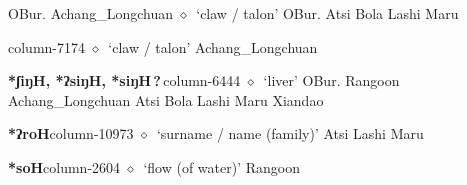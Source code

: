 \hspace{1ex}
         OBur. 
\hspace{1ex}
         Achang\_Longchuan 
\hspace{1ex}
         $\diamond$~`claw / talon'
         OBur. 
\hspace{1ex}
         Atsi 
\hspace{1ex}
         Bola 
\hspace{1ex}
         Lashi 
\hspace{1ex}
         Maru 
  \item {\footnotesize \textbf{}}{\tiny column-7174}
         $\diamond$~`claw / talon'
         Achang\_Longchuan 
  \item {\footnotesize \textbf{*ʃiŋH, *ʔsiŋH, *siŋH\,?\,}}{\tiny column-6444}
         $\diamond$~`liver'
         OBur. 
\hspace{1ex}
         Rangoon 
\hspace{1ex}
         Achang\_Longchuan 
\hspace{1ex}
         Atsi 
\hspace{1ex}
         Bola 
\hspace{1ex}
         Lashi 
\hspace{1ex}
         Maru 
\hspace{1ex}
         Xiandao 
  \item {\footnotesize \textbf{*ʔroH}}{\tiny column-10973}
         $\diamond$~`surname / name (family)'
         Atsi 
\hspace{1ex}
         Lashi 
\hspace{1ex}
         Maru 
  \item {\footnotesize \textbf{*soH}}{\tiny column-2604}
         $\diamond$~`flow (of water)'
         Rangoon 
\hspace{1ex}
